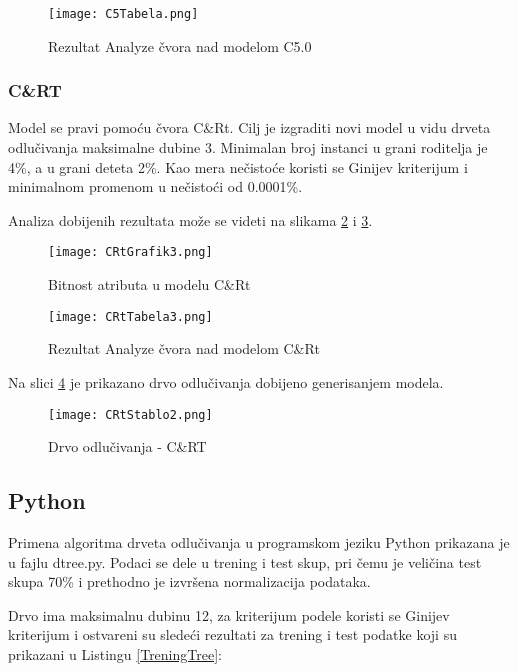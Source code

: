 \documentclass[a4paper]{article}
\begin{document}
\begin{figure}[ht]
    \centering
    \texttt{[image: C5Tabela.png]}
    \caption{Rezultat Analyze čvora nad modelom C5.0}
    \label{fig:C5Tabela}
\end{figure}

\subsubsection{C\&RT}
\label{subsubsec:CRT}

Model se pravi pomoću čvora C\&Rt. Cilj je izgraditi novi model u vidu drveta odlučivanja maksimalne dubine 3. Minimalan broj instanci u grani roditelja je 4\%, a u grani deteta 2\%. Kao mera nečistoće koristi se Ginijev kriterijum i minimalnom promenom u nečistoći od 0.0001\%.

Analiza dobijenih rezultata može se videti na slikama \ref{fig:CRtGrafik3} i \ref{fig:CRtTabela3}.

\begin{figure}[ht!]
    \centering
    \texttt{[image: CRtGrafik3.png]}
    \caption{Bitnost atributa u modelu C\&Rt}
    \label{fig:CRtGrafik3}
\end{figure}
        
\begin{figure}[ht!]
    \centering
    \texttt{[image: CRtTabela3.png]}
    \caption{Rezultat Analyze čvora nad modelom C\&Rt}
    \label{fig:CRtTabela3}
\end{figure}            
Na slici \ref{fig:CRtStablo2} je prikazano drvo odlučivanja dobijeno generisanjem modela.
\begin{figure}[ht!]
    \centering
    \texttt{[image: CRtStablo2.png]}
    \caption{Drvo odlučivanja - C\&RT}
    \label{fig:CRtStablo2}
\end{figure}

\subsection{Python}

Primena algoritma drveta odlučivanja u programskom jeziku Python prikazana je u fajlu dtree.py. Podaci se dele u trening i test skup, pri čemu je veličina test skupa 70\% i prethodno je izvršena normalizacija podataka. 


Drvo ima maksimalnu dubinu 12, za kriterijum podele koristi se Ginijev kriterijum i ostvareni su sledeći rezultati za trening i test podatke koji su prikazani u Listingu \ref{TreningTree}:
\\
\end{document}
